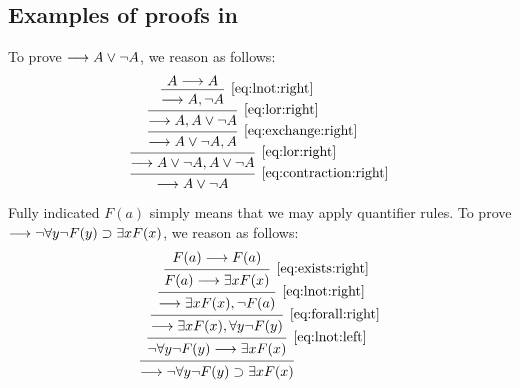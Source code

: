 \documentclass[11pt,a4paper]{article}
\begin{document}
\subsection{\texorpdfstring{Examples of proofs in \LK}{Examples of proofs in LK}}

\begin{example}
    To prove \(\longrightarrow A \lor\lnot A\), we reason as follows:
\begin{equation*}
    \begin{prooftree}
        \hypo{A\seq A}
        \infer1[\eqref{eq:lnot:right}]{\seq A, \lnot A}
        \infer1[\eqref{eq:lor:right}]{\seq A, A\lor\lnot A}
        \infer1[\eqref{eq:exchange:right}]{\seq A\lor\lnot A, A}
        \infer1[\eqref{eq:lor:right}]{\seq A\lor\lnot A, A\lor\lnot A}
        \infer1[\eqref{eq:contraction:right}]{\seq A \lor\lnot A}
    \end{prooftree}
\end{equation*}
\end{example}

\begin{example}\label{exa:fully indicated axiom}
    Fully indicated \(F(a)\) simply means that we may apply quantifier rules.
    To prove \(\longrightarrow\lnot\forall y\lnot F(y)\supset\exists x F(x)\),
    we reason as follows:
\begin{equation*}
    \begin{prooftree}
        \hypo{F(a)\seq F(a)}
        \infer1[\eqref{eq:exists:right}]{F(a)\seq\exists x F(x)}
        \infer1[\eqref{eq:lnot:right}]{\seq\exists x F(x), \lnot F(a)}
        \infer1[\eqref{eq:forall:right}]{\seq\exists x F(x), \forall y \lnot F(y)}
        \infer1[\eqref{eq:lnot:left}]{\lnot\forall y\lnot F(y)\seq\exists x F(x)}
        \infer1[]{\seq\lnot\forall y\lnot F(y)\limplies\exists x F(x)}
    \end{prooftree}
\end{equation*}
\end{example}
\end{document}
